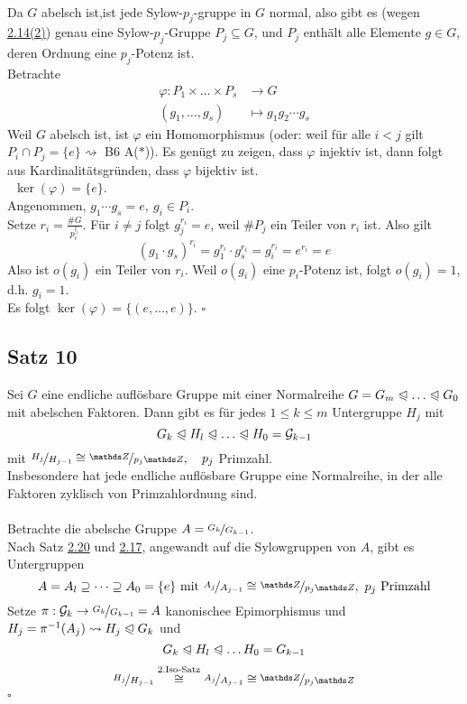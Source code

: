 \\
Da $G$ abelsch ist,ist jede Sylow-$p_j$-gruppe in $G$ normal, also gibt es (wegen \hyperref[sub:def_sylow_gruppe]{2.14(2)}) genau eine Sylow-$p_j$-Gruppe $P_j\subseteq G$, und $P_j$ enthält alle Elemente $g\in G$, deren Ordnung eine $p_j$-Potenz ist.\\
Betrachte
\begin{equation*}
\begin{aligned}
	\varphi:P_1\times\dots\times P_s&\to G\\
	(g_1,\dots,g_s)&\mapsto g_1g_2\cdots g_s
\end{aligned}
\end{equation*}
Weil $G$ abelsch ist, ist $\varphi$ ein Homomorphismus (oder: weil für alle $i<j$ gilt $P_i\cap P_j=\{e\}\rightsquigarrow$ B6 A($\ast$)). Es genügt zu zeigen, dass $\varphi$ injektiv ist, dann folgt aus Kardinalitätsgründen, dass $\varphi$ bijektiv ist.\\
\zz~$\ker(\varphi)=\{e\}$.\\
Angenommen, $g_1\cdots g_s=e,~ g_i\in P_i$.\\
Setze $r_i=\frac{\#G}{p_i^{l_i}}$.
Für $i\neq j$ folgt $g_j^{r_i}=e$, weil $\#P_j$ ein Teiler von $r_i$ ist. 
Also gilt 
\[ 
(g_1\cdot g_s)^{r_i}=g_1^{r_i}\cdot g_s^{r_i}=g_i^{r_i}=e^{r_i}=e 
\]
Also ist $o(g_i)$ ein Teiler von $r_i$. 
Weil $o(g_i)$ eine $p_i$-Potenz ist, folgt $o(g_i)=1$, d.h. $g_i=1$.\\
Es folgt $\ker(\varphi)=\{(e,\dots,e)\}$.
\hfill $\square$

\subsection{Satz 10}
\label{sub:satz_10}
Sei $G$ eine endliche auflösbare Gruppe mit einer Normalreihe $G=G_m\nt\dots\nt G_0$ mit abelschen Faktoren. 
Dann gibt es für jedes $1\le k\le m$ Untergruppe $H_j$ mit
\[
G_k\nt H_l\nt\dots\nt H_0=\G_{k-1}
\]
mit $\nicefrac{H_j}{H_{j-1}}\cong \nicefrac{\Z}{p_j\Z},\quad p_j$ Primzahl.\\
Insbesondere hat jede endliche auflösbare Gruppe eine Normalreihe, in der alle Faktoren zyklisch von Primzahlordnung sind.\\

\\
Betrachte die abelsche Gruppe $A=\nicefrac{G_k}{G_{k-1}}$.\\
Nach Satz \hyperref[sub:satz_9]{2.20} und \hyperref[sub:lemma_4]{2.17}, angewandt auf die Sylowgruppen von $A$, gibt es Untergruppen
\[
A=A_l\supseteq \dots\supseteq A_0=\{e\}\text{ mit } \nicefrac{A_j}{A_{j-1}}\cong\nicefrac{\Z}{p_j\Z},~p_j\text{ Primzahl}
\] 
Setze $\pi:\mathcal{G}_k\to\nicefrac{G_k}{G_{k-1}}=A$ kanonischee Epimorphismus und $H_j=\pi^{-1}(A_j)\rightsquigarrow H_j\trianglelefteqslant G_k$ und
\[
G_k\trianglelefteqslant H_l\trianglelefteqslant \dots H_0=G_{k-1}
\]
\[
\nicefrac{H_j}{H_{j-1}}\stackrel{\text{2.Iso-Satz}}{\cong} \nicefrac{A_j}{A_{j-1}} \cong \nicefrac{\Z}{p_j\Z}
\]
\hfill $\square$

